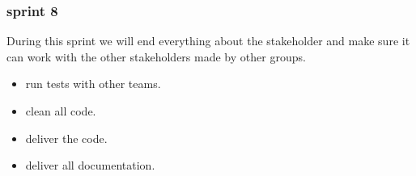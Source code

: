 \subsubsection{sprint 8}
During this sprint we will end everything about the stakeholder and make sure it can work with the other stakeholders made by other groups.
\begin{itemize}
	\item run tests with other teams.
	\item clean all code.
	\item deliver the code.
	\item deliver all documentation.
\end{itemize}
\newpage
